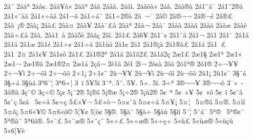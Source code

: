 {2^^e1^^ad^^a8
2^^e1^^e1^^aa
2^^e1^^e2^^a2.
2^^e1^^e2^^a5^^e0^^ab
2^^e1^^e2^^aa
2^^e1^^e2^^ad
2^^e1^^e2^^e0.
2^^e1^^e2^^ec.
2^^e1^^e2^^f5^^e0^^ab
2^^e1^^e2.
2^^e1^^e4^^ae^^e0
2^^e11^^a8^^e1^^af
2^^e11^^a82^^ae^^e0
2^^e11^^ab^^a8^^e0^^e3
2^^e11^^ab^^f7^^e0^^e3
2^^e11^^ac^^e3
2^^e11^^f7^^e1^^af
2^^e11^^f72^^ae^^e0
2^^e2^^a0^^ac^^af
2^^e2^^a9
2^^e2^^ae^^ac^^ac
2^^e2^^ae^^ac^^e9
2^^e2^^ae^^ad^^a3
2^^e2^^e0^^a0^^a1^^ae
2^^e2^^e0^^a1
2^^e2^^e0^^a3
2^^e2^^e0^^a4
2^^e2^^e0^^a5
2^^e2^^e0^^a8^^a3^^e0
2^^e2^^e0^^aa
2^^e2^^e0^^ac
2^^e2^^e0^^af
2^^e2^^e0^^e0
2^^e2^^e0^^e2
2^^e2^^e0^^e4
2^^e2^^e0^^e6
2^^e2^^e0^^e9
2^^e2^^e0^^f7^^a3^^e0
2^^e2^^e0.
2^^e2^^e01^^a0^^e0
2^^e2^^e05^^e8
2^^e2^^e3^^e7
2^^e2^^ec.
2^^e21^^a3
2^^e26^^a5
2^^e21^^a8^^ad^^a2
2^^e21^^a8^^ad^^e4
2^^e21^^ac
2^^e21^^ad
2^^e21^^af
2^^e21^^e1
2^^e21^^e4
2^^e21^^e6
2^^e21^^e9
2^^e21^^f7^^ad^^a2
2^^e21^^f7^^ad^^e4
2^^e21^^f9^^ad^^e4
2^^e41^^a2
2^^e41^^ad
2^^e41^^ae^^a1^^e0
2^^e41^^ae^^e0^^a3
2^^e41^^e1
2^^e51^^a0^^ad^^a3
2^^e51^^a02^^a4
2^^e51^^a2^^a5
2^^e51^^a2^^f5
2^^e51^^a3
2^^e51^^ae2^^aa
2^^e51^^e1
2^^e51^^e32^^a3
2^^e51^^e32^^e7
2^^e61^^a3
2^^e61^^a7
2^^e61^^aa
2^^e61^^ab
2^^e61^^ac
2^^e61^^ae^^e2
2^^e61^^ae2^^a4
2^^e61^^e1
2^^e7^^e2^^ac
2^^e81^^e4
2^^e91^^ad
2^^ee^^ac
2^^f5^^a2^^e0
2^^f5^^ad^^e0
2^^f51^^aa^^ae
2^^f51^^ae
2^^f7^^ac^^a5^^ad^^a5
2^^f7^^ac^^a5^^ad^^ec
2^^f7^^ac^^f5^^ad^^ec
2^^f7^^ac^^f5^^ad^^f5
2^^f71^^a1
2^^f71^^a2^^a8
2^^f9^^ac^^a5^^ad^^a5
2^^f9^^ac^^a5^^ad^^ec
2^^f9^^ac^^f5^^ad^^ec
2^^f9^^ac^^f5^^ad^^f5
2^^f91^^a1
2^^f91^^a2^^a8
3^^a7^^a8^^e1
3^^a7^^f7^^e1
3^^a7^^f9^^e1
3^^aa6^^ad^^a8^^a6
3^^aa6^^ad^^f7^^a6
3^^ad^^a0^^ef
5^^ad^^a5^^ad5^^ad^^ef
3^^ad^^a8^^aa.
5^^ad^^a8.
5^^ad^^a5.
5^^ad^^f7.
5^^ad^^ef.
3^^ad^^f7^^aa
3^^ae^^ac^^ac^^a5
3^^ae^^ac^^ac^^f5
3^^af^^ab^^a0^^ad
3^^e5^^ae^^e0
3^^e7^^a8^^a9
3^^e7^^f7^^a9
5^^a1^^a2
5^^a1^^a82^^ae
5^^a1^^ae^^e2
5^^a1^^ae^^e6
5^^a1^^f72^^ae
5^^a1^^f92^^ae
5^^a2^^a0^^aa
5^^a2^^a0^^ab^^a5
5^^a2^^a0^^ab^^f5
5^^a2^^a0^^ef
5^^a2^^a8^^ad^^e2
5^^a2^^a8^^ad^^e7
5^^a2^^e3^^a0
5^^a2^^f7^^ad^^e2
5^^a2^^f7^^ad^^e7
5^^a3^^ab^^a5^^ac
5^^a3^^ab^^f5^^ac
5^^a4^^a2^^a8^^ad^^e3
5^^a4^^a2^^f7^^ad^^e3
5^^a4^^a5^^a1
5^^a4^^a6^^a0
5^^a4^^ae^^e2
5^^a4^^ae.
5^^a4^^ec^^ee
5^^a4^^f5^^a1
5^^a46^^ab^^a5^^a9
5^^a46^^ab^^f5^^a9
5^^a6^^a5^^a2
5^^a6^^f5^^a2
5^^a7^^ae.
5^^a7^^e0^^a8
5^^a7^^e0^^f7
5^^a7^^e0^^f9
5^^a7^^ec^^ee
5^^a8^^ad^^a6
5^^a8^^ad^^e1^^af
5^^aa^^ae^^a0
5^^aa^^ae^^a2^^a8
5^^aa^^ae^^e0^^a8
5^^aa6^^e2^^ae.
5^^ab^^a8^^a3
5^^ab^^a8^^e6^^ae
5^^ab^^a8^^e7^^a8
5^^ab^^f7^^a3
5^^ab^^f7^^e6^^ae
5^^ab^^f7^^e7^^f7
5^^ab^^f9^^a3
5^^ab^^f9^^e6^^ae
5^^ab^^f9^^e7^^f9
5^^ab6^^a6^^a5^^e8
}

